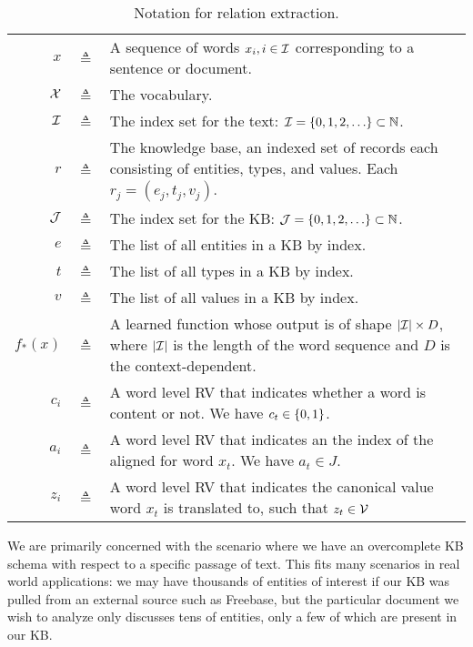 \documentclass[12pt]{article}
\begin{document}
\begin{table}[htbp]\caption{Notation for relation extraction.}
\centering %
\begin{tabular}{r c p{10cm}}
\toprule
$x$ & $\triangleq$ & A sequence of words $x_i, i \in \mathcal{I}$
    corresponding to a sentence or document.\\
$\mathcal{X}$ & $\triangleq$ & The vocabulary.\\
$\mathcal{I}$ & $\triangleq$ & The index set for the text:
    $\mathcal{I} = \left\{0,1,2,\ldots\right\}\subset \mathbb{N}$.\\
\midrule
$r$ & $\triangleq$ & The knowledge base,
    an indexed set of records each consisting of entities, types, and values.
    Each $r_j = (e_j, t_j, v_j)$.\\
$\mathcal{J}$ & $\triangleq$ & The index set for the KB:
    $\mathcal{J} = \left\{0,1,2,\ldots\right\}\subset \mathbb{N}$.\\
$e$ & $\triangleq$ & The list of all entities in a KB by index.\\
$t$ & $\triangleq$ & The list of all types in a KB by index.\\
$v$ & $\triangleq$ & The list of all values in a KB by index.\\
\midrule
$f_*(x)$ & $\triangleq$ & A learned function whose output is of shape $|\mathcal{I}| \times D$,
    where $|\mathcal{I}|$ is the length of the word sequence and $D$ is the context-dependent.\\
$c_i$ & $\triangleq$ & A word level RV that indicates whether a word is content or not.
    We have $c_t \in \left\{0,1\right\}$.\\
$a_i$ & $\triangleq$ & A word level RV that indicates an the index of the aligned
    for word $x_t$. We have $a_t \in J$.\\
$z_i$ & $\triangleq$ & A word level RV that indicates the canonical value 
word $x_t$ is translated to, such that $z_t \in \mathcal{V}$\\
\bottomrule
\end{tabular}
\label{tab:TableOfNotationForMyResearch}
\end{table}

We are primarily concerned with the scenario where we have an overcomplete KB schema with
respect to a specific passage of text.
This fits many scenarios in real world applications:
we may have thousands of entities of interest if our KB was pulled from an 
external source such as Freebase,
but the particular document we wish to analyze only discusses tens of entities,
only a few of which are present in our KB.
\end{document}

